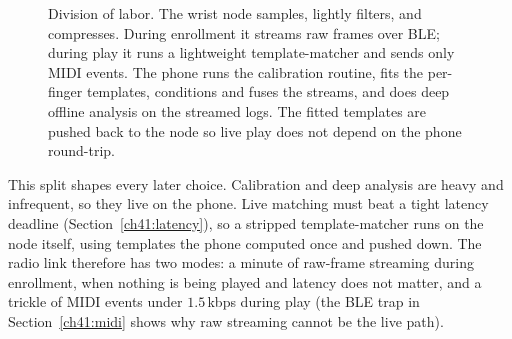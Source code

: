 \begin{figure}[H]
\centering
{}
\caption{Division of labor. The wrist node samples, lightly filters, and
compresses. During enrollment it streams raw frames over BLE; during play it runs
a lightweight template-matcher and sends only MIDI events. The phone runs the calibration routine, fits the
per-finger templates, conditions and fuses the streams, and does deep offline
analysis on the streamed logs. The fitted templates are pushed back to the node
so live play does not depend on the phone round-trip.}
\label{ch41:fig-arch}
\end{figure}

This split shapes every later choice. Calibration and
deep analysis are heavy and infrequent, so they live on the phone. Live matching
must beat a tight latency deadline (Section~\ref{ch41:latency}), so a stripped
template-matcher runs on the node itself, using templates the phone computed once
and pushed down. The radio link therefore has two modes: a minute of raw-frame
streaming during enrollment, when nothing is being played and latency does not
matter, and a trickle of MIDI events under $1.5\,$kbps during play (the BLE trap in
Section~\ref{ch41:midi} shows why raw streaming cannot be the live path).

